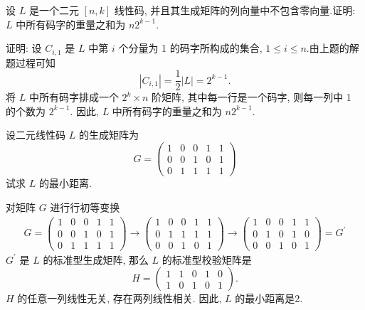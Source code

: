 \begin{exercise}
设 $ L $ 是一个二元 $ [n, k] $ 线性码, 并且其生成矩阵的列向量中不包含零向量.证明: $ L $ 中所有码字的重量之和为 $ n 2^{k-1} $.
\end{exercise}
\begin{solution}
    证明: 设 $ C_{i, 1} $ 是 $ L $ 中第 $ i $ 个分量为 1 的码字所构成的集合, $ 1 \leq i \leq n $.由上题的解题过程可知
$$
\left|C_{i, 1}\right|=\frac{1}{2}|L|=2^{k-1} .
$$
将 $ L $ 中所有码字排成一个 $ 2^{k} \times n $ 阶矩阵, 其中每一行是一个码字, 则每一列中 1 的个数为 $ 2^{k-1} $. 因此, $ L $ 中所有码字的重量之和为 $ n 2^{k-1} $.
\end{solution}



\begin{exercise}
 设二元线性码 $ L $ 的生成矩阵为
$$
G=\left(\begin{array}{lllll}
1 & 0 & 0 & 1 & 1 \\
0 & 0 & 1 & 0 & 1 \\
0 & 1 & 1 & 1 & 1
\end{array}\right)
$$
试求 $ L $ 的最小距离.
\end{exercise}
\begin{solution}
对矩阵 $ G $ 进行行初等变换
$$
\begin{array}{l}
G=\left(\begin{array}{lllll}
1 & 0 & 0 & 1 & 1 \\
0 & 0 & 1 & 0 & 1 \\
0 & 1 & 1 & 1 & 1
\end{array}\right) \rightarrow\left(\begin{array}{lllll}
1 & 0 & 0 & 1 & 1 \\
0 & 1 & 1 & 1 & 1 \\
0 & 0 & 1 & 0 & 1
\end{array}\right) \rightarrow 
\left(\begin{array}{lllll}
1 & 0 & 0 & 1 & 1 \\
0 & 1 & 0 & 1 & 0 \\
0 & 0 & 1 & 0 & 1
\end{array}\right)=G^{\prime}
\end{array}
$$
$ G^{\prime} $ 是 $ L $ 的标准型生成矩阵, 那么 $ L $ 的标准型校验矩阵是
$$
H=\left(\begin{array}{lllll}
1 & 1 & 0 & 1 & 0 \\
1 & 0 & 1 & 0 & 1
\end{array}\right) .
$$
$ H $ 的任意一列线性无关, 存在两列线性相关. 因此, $ L $ 的最小距离是2.
\end{solution}
